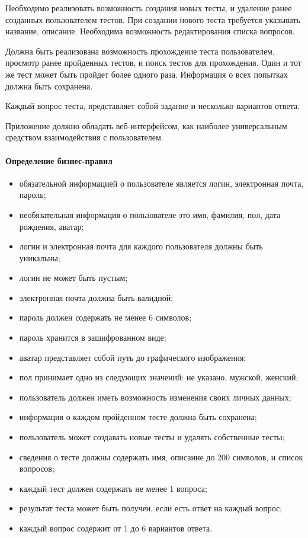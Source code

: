 Необходимо реализовать возможность создания новых тесты, и удаление ранее созданных пользователем тестов. При создании нового теста требуется указывать название, описание. Необходима возможность редактирования списка вопросов.

Должна быть реализована возможность прохождение теста пользователем, просмотр ранее пройденных тестов, и поиск тестов для прохождения. Один и тот же тест может быть пройдет более одного раза. Информация о всех попытках должна быть сохранена.

Каждый вопрос теста, представляет собой задание и несколько вариантов ответа.

Приложение должно обладать веб-интерфейсом, как наиболее универсальным средством взаимодействия с пользователем. 

\paragraph{Определение бизнес-правил }


\begin{itemize}
	\item обязательной информацией о пользователе является логин, электронная почта, пароль;
	\item необязательная информация о пользователе это имя, фамилия, пол, дата рождения, аватар;
	\item логин и электронная почта для каждого пользователя должны быть уникальны;
	\item логин не может быть пустым;
	\item электронная почта должна быть валидной;
	\item пароль должен содержать не менее 6 символов;
	\item пароль хранится в зашифрованном виде;
	\item аватар представляет собой путь до графического изображения;
	\item пол принимает одно из следующих значений: не указано, мужской, женский;
	\item пользователь должен иметь возможность изменения своих личных данных;
	\item информация о каждом пройденном тесте должна быть сохранена;
	\item пользователь может создавать новые тесты и удалять собственные тесты;
	\item сведения о тесте должны содержать имя, описание до 200 символов, и список вопросов;
	\item каждый тест должен содержать не менее 1 вопроса;
	\item результат теста может быть получен, если есть ответ на каждый вопрос;
	\item каждый вопрос содержит от 1 до 6 вариантов ответа.
\end{itemize}
